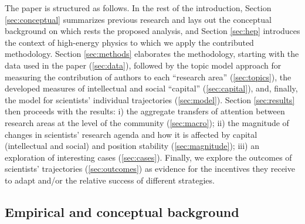 \documentclass{article}
\begin{document}
The paper is structured as follows. In the rest of the introduction, Section \ref{sec:conceptual} summarizes previous research and lays out the conceptual background on which rests the proposed analysis, and Section \ref{sec:hep} introduces the context of high-energy physics to which we apply the contributed methodology. %
Section \ref{sec:methods} elaborates the methodology, starting with the data used in the paper (\ref{sec:data}), followed by the topic model approach for measuring the contribution of authors to each ``research area'' (\ref{sec:topics}), the developed measures of intellectual and social ``capital'' (\ref{sec:capital}), and, finally, the model for scientists' individual trajectories (\ref{sec:model}).
Section \ref{sec:results} then proceeds with the results: i) the aggregate transfers of attention between research areas at the level of the community (\ref{sec:macro}); ii) the magnitude of changes in scientists' research agenda and how it is affected by capital (intellectual and social) and position stability (\ref{sec:magnitude}); iii) an exploration of interesting cases (\ref{sec:cases}). Finally, we explore the outcomes of scientists' trajectories (\ref{sec:outcomes}) as evidence for the incentives they receive to adapt and/or the relative success of different strategies. 


\subsection{\label{sec:conceptual}Empirical and conceptual background}
\end{document}
